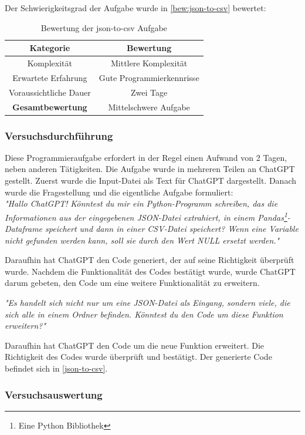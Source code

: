 Der Schwierigkeitsgrad der Aufgabe wurde in \autoref{bew:json-to-csv} bewertet:
\begin{table}[h]
\centering
\begin{tabular}{|c|c|}
\hline
\textbf{Kategorie} & \textbf{Bewertung}  \\ \hline
Komplexität & Mittlere Komplexität \\ \hline
Erwartete Erfahrung & Gute Programmierkennrisse  \\ \hline
Voraussichtliche Dauer & Zwei Tage \\ \hline
\textbf{Gesamtbewertung} & Mittelschwere Aufgabe \\ \hline
\end{tabular}
\caption{Bewertung der json-to-csv Aufgabe}
\label{bew:json-to-csv}
\end{table}

\subsubsection{Versuchsdurchführung}
Diese Programmieraufgabe erfordert in der Regel einen Aufwand von 2 Tagen, neben anderen Tätigkeiten. Die Aufgabe wurde in mehreren Teilen an ChatGPT gestellt. Zuerst wurde die Input-Datei als Text für ChatGPT dargestellt. Danach wurde die Fragestellung und die eigentliche Aufgabe formuliert: \\

\emph{"Hallo ChatGPT! Könntest du mir ein Python-Programm schreiben, das die Informationen aus der eingegebenen JSON-Datei extrahiert, in einem Pandas\footnote{Eine Python Bibliothek}-Dataframe speichert und dann in einer CSV-Datei speichert? Wenn eine Variable nicht gefunden werden kann, soll sie durch den Wert NULL ersetzt werden."}

Daraufhin hat ChatGPT den Code generiert, der auf seine Richtigkeit überprüft wurde. Nachdem die Funktionalität des Codes bestätigt wurde, wurde ChatGPT darum gebeten, den Code um eine weitere Funktionalität zu erweitern.

\emph{"Es handelt sich nicht nur um eine JSON-Datei als Eingang, sondern viele, die sich alle in einem Ordner befinden. Könntest du den Code um diese Funktion erweitern?"}

Daraufhin hat ChatGPT den Code um die neue Funktion erweitert. Die Richtigkeit des Codes wurde überprüft und bestätigt. Der generierte Code befindet sich in \autoref{json-to-csv}.

\subsubsection{Versuchsauswertung}


